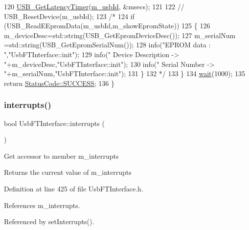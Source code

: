 \begin{DoxyCode}
120     \hyperlink{LALUsbML_8h_a90c0ec96b211bb1b45c4b26afe6f6ced}{USB\_GetLatencyTimer}(\hyperlink{classUsbFTInterface_a91df5c0547e8be460bc087e27afe05aa}{m\_usbId}, &msecs);
121 
122     \textcolor{comment}{//    USB\_ResetDevice(m\_usbId);}
123 \textcolor{comment}{/*}
124 \textcolor{comment}{    if (USB\_ReadEEpromData(m\_usbId,m\_showEpromState))
}
125 \textcolor{comment}{    \{
}
126 \textcolor{comment}{      m\_deviceDesc=std::string(USB\_GetEpromDeviceDesc());
}
127 \textcolor{comment}{      m\_serialNum =std::string(USB\_GetEpromSerialNum());
}
128 \textcolor{comment}{      info("EPROM data : ","UsbFTInterface::init");
}
129 \textcolor{comment}{      info("  Device Description -> "+m\_deviceDesc,"UsbFTInterface::init");
}
130 \textcolor{comment}{      info("  Serial Number      -> "+m\_serialNum,"UsbFTInterface::init");      
}
131 \textcolor{comment}{    \}
}
132 \textcolor{comment}{*/}
133   \}
134   \hyperlink{Tools_8h_a74d6a3fc8194eaac3e1f888db0542be9}{wait}(1000);
135   \textcolor{keywordflow}{return} \hyperlink{classStatusCode_a6f565cbeadc76d14c72f047e5e85eb4badd0da38d3ba0d922efd1f4619bc37ad8}{StatusCode::SUCCESS};
136 \}
\end{DoxyCode}
\mbox{\label{classUsbFTInterface_a1831ba02d9707ded902af4cb1df8863f}} 
\subsubsection{\texorpdfstring{interrupts()}{interrupts()}}
{\footnotesize\ttfamily bool Usb\+F\+T\+Interface\+::interrupts (\begin{DoxyParamCaption}{ }\end{DoxyParamCaption})\hspace{0.3cm}{\ttfamily [inline]}}

Get accessor to member m\+\_\+interrupts \begin{DoxyReturn}{Returns}
the current value of m\+\_\+interrupts 
\end{DoxyReturn}


Definition at line 425 of file Usb\+F\+T\+Interface.\+h.



References m\+\_\+interrupts.



Referenced by set\+Interrupts().


